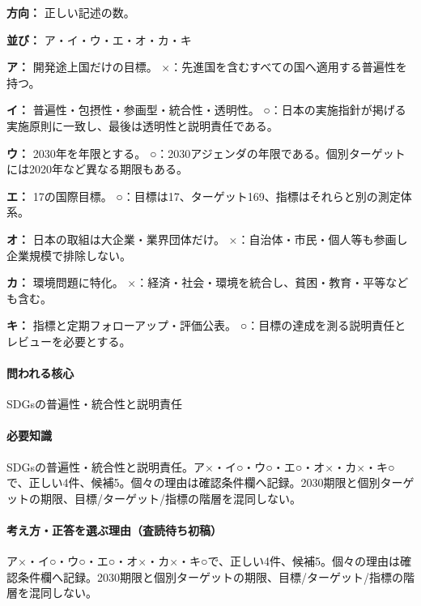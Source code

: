\noindent\textbf{方向：} 正しい記述の数。\par

\noindent\textbf{並び：} ア・イ・ウ・エ・オ・カ・キ\par

\noindent\textbf{ア：} 開発途上国だけの目標。 ×：先進国を含むすべての国へ適用する普遍性を持つ。\par

\noindent\textbf{イ：} 普遍性・包摂性・参画型・統合性・透明性。 ○：日本の実施指針が掲げる実施原則に一致し、最後は透明性と説明責任である。\par

\noindent\textbf{ウ：} 2030年を年限とする。 ○：2030アジェンダの年限である。個別ターゲットには2020年など異なる期限もある。\par

\noindent\textbf{エ：} 17の国際目標。 ○：目標は17、ターゲット169、指標はそれらと別の測定体系。\par

\noindent\textbf{オ：} 日本の取組は大企業・業界団体だけ。 ×：自治体・市民・個人等も参画し企業規模で排除しない。\par

\noindent\textbf{カ：} 環境問題に特化。 ×：経済・社会・環境を統合し、貧困・教育・平等なども含む。\par

\noindent\textbf{キ：} 指標と定期フォローアップ・評価公表。 ○：目標の達成を測る説明責任とレビューを必要とする。\par

\paragraph{問われる核心} SDGsの普遍性・統合性と説明責任

\paragraph{必要知識} SDGsの普遍性・統合性と説明責任。ア×・イ○・ウ○・エ○・オ×・カ×・キ○で、正しい4件、候補5。個々の理由は確認条件欄へ記録。2030期限と個別ターゲットの期限、目標/ターゲット/指標の階層を混同しない。

\paragraph{考え方・正答を選ぶ理由（査読待ち初稿）} ア×・イ○・ウ○・エ○・オ×・カ×・キ○で、正しい4件、候補5。個々の理由は確認条件欄へ記録。2030期限と個別ターゲットの期限、目標/ターゲット/指標の階層を混同しない。

